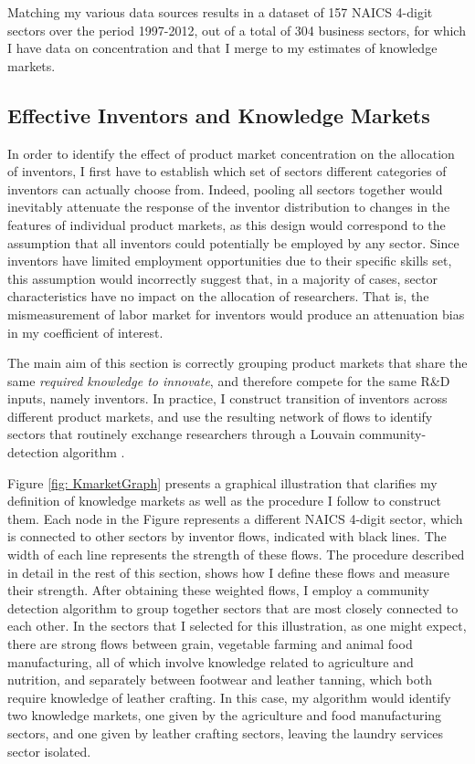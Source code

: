 Matching my various data sources results in a dataset of 157 NAICS
4-digit sectors over the period 1997-2012, out of a total of 304 business
sectors, for which I have data on concentration and that I merge to
my estimates of knowledge markets.

\subsection{Effective Inventors and Knowledge Markets\label{subsec:KnowledgeMarkets}}

In order to identify the effect of product market concentration on
the allocation of inventors, I first have to establish which set of
sectors different categories of inventors can actually choose from.
Indeed, pooling all sectors together would inevitably attenuate the
response of the inventor distribution to changes in the features of
individual product markets, as this design would correspond to the
assumption that all inventors could potentially be employed by any
sector. Since inventors have limited employment opportunities due
to their specific skills set, this assumption would incorrectly suggest
that, in a majority of cases, sector characteristics have no impact
on the allocation of researchers. That is, the mismeasurement of labor
market for inventors would produce an attenuation bias in my coefficient
of interest. 

The main aim of this section is correctly grouping product markets
that share the same \emph{required knowledge to innovate}, and therefore
compete for the same R\&D inputs, namely inventors. In practice, I
construct transition of inventors across different product markets,
and use the resulting network of flows to identify sectors that routinely
exchange researchers through a Louvain community-detection algorithm
\citep{blondelFastUnfoldingCommunities2008}. 

Figure \ref{fig: KmarketGraph} presents a graphical illustration
that clarifies my definition of knowledge markets as well as the procedure
I follow to construct them. Each node in the Figure represents a different
NAICS 4-digit sector, which is connected to other sectors by inventor
flows, indicated with black lines. The width of each line represents
the strength of these flows. The procedure described in detail in
the rest of this section, shows how I define these flows and measure
their strength. After obtaining these weighted flows, I employ a community
detection algorithm to group together sectors that are most closely
connected to each other. In the sectors that I selected for this illustration,
as one might expect, there are strong flows between grain, vegetable
farming and animal food manufacturing, all of which involve knowledge
related to agriculture and nutrition, and separately between footwear
and leather tanning, which both require knowledge of leather crafting.
In this case, my algorithm would identify two knowledge markets, one
given by the agriculture and food manufacturing sectors, and one given
by leather crafting sectors, leaving the laundry services sector isolated. 

